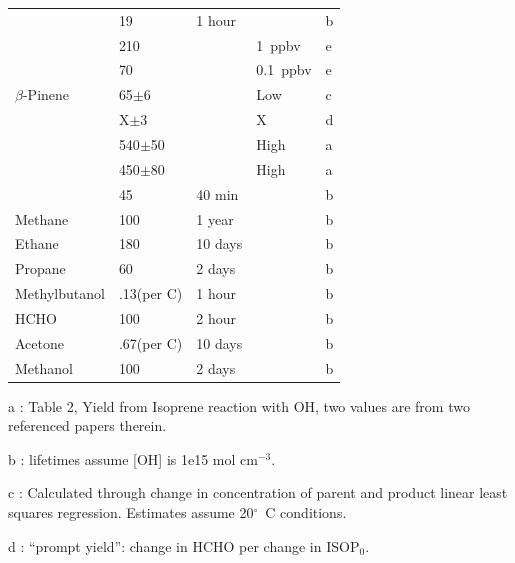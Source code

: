 \begin{table}
\begin{threeparttable}
\begin{tabular}{  l  l  l  l  l  }
                        & 19              & 1 hour &              & b        \\ %
                        & 210             &        & 1~ppbv        & e        \\
                        & 70              &        & 0.1~ppbv      & e        \\
        $\beta$-Pinene  & 65$\pm$6        &        & Low           & c      \\ 
                        & X$\pm$3         &        & X             & d      \\ 
                        & 540$\pm$50      &        & High          & a     \\ 
                        & 450$\pm$80      &        & High          & a      \\ 
                        & 45              & 40 min &              & b      \\ %
        Methane 	      & 100             & 1 year  &             & b     \\ 
        Ethane          & 180             & 10 days &             & b     \\ 
        Propane         & 60              & 2 days  &             & b     \\ 
        Methylbutanol   & .13(per C)    & 1 hour  &             & b     \\ 
        HCHO            & 100             & 2 hour  &             & b     \\ 
        Acetone         & .67(per C)      & 10 days &             & b     \\ 
        Methanol        & 100             & 2 days  &             & b     \\ %
        \bottomrule
      \end{tabular}
      \begin{tablenotes} %
        \item a \textcite{AtkinsonArey2003}: Table 2, Yield from Isoprene reaction with OH, two values are from two referenced papers therein.
        \item b \textcite{Palmer2003}: lifetimes assume [OH] is 1e15 mol cm$^{-3}$.
        \item c \parencite{Lee2006}: Calculated through change in concentration of parent and product linear least squares regression.
        Estimates assume 20$^\circ$~C conditions.
        \item d \textcite{Wolfe2016}: ``prompt yield'': change in HCHO per change in ISOP$_0$.

\end{tablenotes}
\end{threeparttable}
\end{table}
